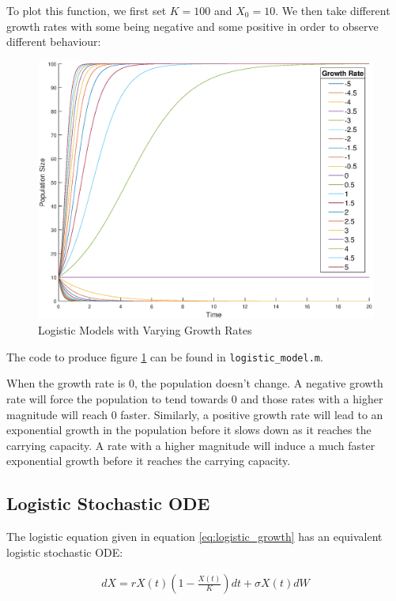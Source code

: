 \documentclass[]{article}
\def\incode#1{\texttt{#1}}
\begin{document}
	To plot this function, we first set $K = 100$ and $X_0 = 10$. We then take different growth rates with some being negative and some positive 
	in order to observe different behaviour:
	
	\begin{figure}[h]
		\centering
		\includegraphics[scale = 0.35]{images/logistic_model.eps}
		\caption{Logistic Models with Varying Growth Rates}
		\label{fig:logistic_model}
	\end{figure}

	The code to produce figure \ref{fig:logistic_model} can be found in \incode{logistic\_model.m}.
	
	When the growth rate is 0, the population doesn't change. A negative growth rate will force the population to tend towards 0 and those 
	rates with a higher magnitude will reach 0 faster. Similarly, a positive growth rate will lead to an exponential growth in the population 
	before it slows down as it reaches the carrying capacity. A rate with a higher magnitude will induce a much faster exponential growth before it 
	reaches the carrying capacity.
	
	\subsection{Logistic Stochastic ODE}
	The logistic equation given in equation \ref{eq:logistic_growth} has an equivalent logistic stochastic ODE:
	
	\begin{align}
		dX = rX(t)\left(1 - \frac{X(t)}{K}\right)dt + \sigma X(t)dW
		\label{eq:logistic_stochastic}
	\end{align} 
	
\end{document}
